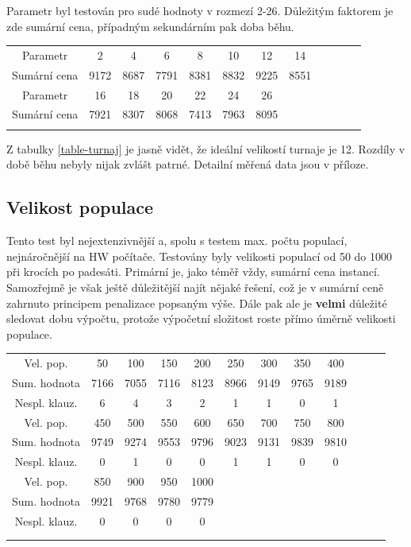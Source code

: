 \documentclass[a4paper]{article}
\begin{document}
		Parametr byl testován pro sudé hodnoty v rozmezí 2-26. Důležitým faktorem je zde sumární cena, případným sekundárním pak doba běhu.
		
		\begin{tabular}{cccccccccccc} \label{table-turnaj}
			\\
			Parametr & 2 & 4 & 6 & 8 & 10 & 12 & 14\\
			Sumární cena & 9172 & 8687 & 7791 & 8381 & 8832 & 9225 & 8551\\
			\hline
			Parametr & 16 & 18 & 20 & 22 & 24 & 26 \\
			Sumární cena & 7921 & 8307 & 8068 & 7413 & 7963 & 8095\\
			\\
			\end{tabular}
		
		Z tabulky \ref{table-turnaj} je jasně vidět, že ideální velikostí turnaje je 12. Rozdíly v době běhu nebyly nijak zvlášt patrné. Detailní měřená data jsou v příloze.
	
	\subsection{Velikost populace}
		Tento test byl nejextenzivnější a, spolu s testem max. počtu populací, nejnáročnější na HW počítače. Testovány byly velikosti populací od 50 do 1000 při krocích po padesáti. Primární je, jako téměř vždy, sumární cena instancí. Samozřejmě je však ještě důležitější najít nějaké řešení, což je v sumární ceně zahrnuto principem penalizace popsaným výše. Dále pak ale je \textbf{velmi} důležité sledovat dobu výpočtu, protože výpočetní složitost roste přímo úměrně velikosti populace.
		
		\begin{tabular}{cccccccccccc} \label{table-pop-size}
		\\
		Vel. pop. & 50 & 100 & 150 & 200 & 250 & 300 & 350 & 400 \\
		Sum. hodnota & 7166&7055	&7116	&8123&	8966	&9149&	9765&	9189	\\
		Nespl. klauz.  & 6	&4&	3	&2	&1&	1	&0&	1\\
		\hline
		Vel. pop. & 450 & 500 & 550 & 600 & 650 & 700 & 750 & 800\\
		Sum. hodnota &9749&	9274	&9553	&9796&	9023&	9131&	9839&	9810\\
		Nespl. klauz. &0	&1&	0	&0	&1&	1&	0	&0 \\
		\hline
 		Vel. pop. & 850 & 900 & 950 & 1000\\
		Sum. hodnota & 9921	&9768&	9780	&9779\\
		Nespl. klauz.&	0&	0	&0&	0\\\\
		\\
		\end{tabular}
		
\end{document}
